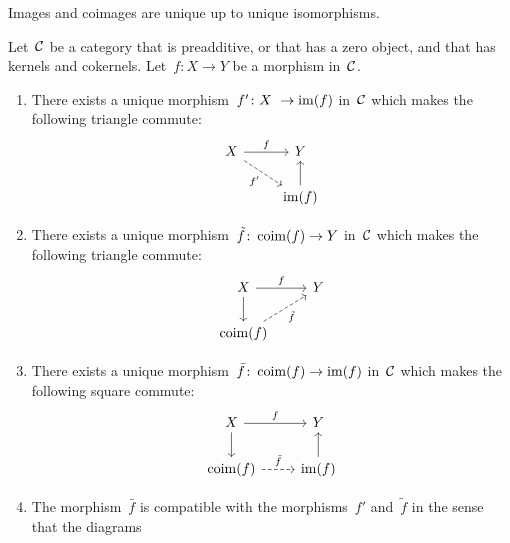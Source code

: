 \begin{remarknonum}
  Images and coimages are unique up to unique isomorphisms.
\end{remarknonum}


\begin{lemma}
  \label{canonical factorization}
  Let~$\mathcal{C}$ be a category that is preadditive, or that has a zero object, and that has kernels and cokernels.
  Let~$f \colon X \to Y$ be a morphism in~$\mathcal{C}$.
  \begin{enumerate}
    \item
      \label{restriction to image}
      There exists a unique morphism~$f' \colon X \to \im(f)$ in~$\mathcal{C}$ which makes the following triangle commute:
      \[
        \begin{tikzcd}
            X
            \arrow{r}[above]{f}
            \arrow[dashed]{dr}[below left]{f'}
          & Y
          \\
            {}
          & \im(f)
            \arrow{u}
        \end{tikzcd}
      \]
    \item
      There exists a unique morphism~$\tilde{f} \colon \operatorname{coim}(f) \to Y$ in~$\mathcal{C}$ which makes the following triangle commute:
      \[
        \begin{tikzcd}
            X
            \arrow{r}[above]{f}
            \arrow{d}
          & Y
          \\
            \coim(f)
            \arrow[dashed]{ur}[below right]{\tilde{f}}
          & {}
        \end{tikzcd}
      \]
    \item
      There exists a unique morphism~$\bar{f} \colon \operatorname{coim}(f) \to \operatorname{im}(f)$ in~$\mathcal{C}$ which makes the following square commute:
      \begin{equation}
        \label{canonical morphism from coim to im}
        \begin{tikzcd}
            X
            \arrow{r}[above]{f}
            \arrow{d}
          & Y
          \\
            \coim(f)
            \arrow[dashed]{r}[above]{\bar{f}}
          & \im(f)
            \arrow{u}
        \end{tikzcd}
      \end{equation}
    \item
      The morphism~$\bar{f}$ is compatible with the morphisms~$f'$ and~$\tilde{f}$ in the sense that the diagrams
      \begin{equation}

\end{equation}
\end{enumerate}
\end{lemma}

